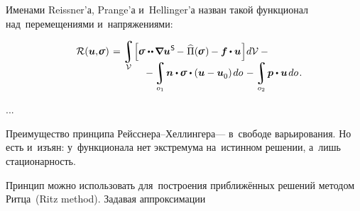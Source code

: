 \begin{otherlanguage}{russian}

\noindent
Именами Reissner’а, Prange’а и~Hellinger’а назван такой функционал над~перемещениями и~напряжениями:

\nopagebreak\vspace{-0.25em}\begin{multline}\label{reissnerhellingervariationalprinciple}
\shoveleft{\displaystyle \mathcal{R}(\bm{u}, \hspace{-0.32ex}\linearstress) \hspace{0.2ex} =
\integral\displaylimits_{\mathcal{V}} \hspace{-0.4ex}
\left[^{\mathstrut} \hspace{-0.2ex}
\linearstress \dotdotp \hspace{-0.16ex} \boldnabla {\bm{u}}^{\hspace{0.08ex}\mathsf{S}} \hspace{-0.2ex} - \hspace{.1ex} \widehat{\Pi}(\hspace{-0.1ex}\linearstress\hspace{.1ex})\hspace{-0.1ex} -
\bm{f} \hspace{-0.1ex} \dotp \bm{u}
\hspace{.1ex} \right] \hspace{-0.32ex} d\mathcal{V} \hspace{.5ex} - \hfill} \\[-1.2em]
%
\hspace{8em} \displaystyle - \integral\displaylimits_{o_1} \hspace{-0.25ex} \bm{n} \dotp \hspace{-0.1ex} \linearstress \dotp \left( \bm{u} - \bm{u}_{\raisemath{-0.1em}{0}} \right) \hspace{-0.1ex} do \hspace{.2ex} -
\integral\displaylimits_{o_2} \hspace{-0.2ex} \bm{p} \dotp \bm{u} \hspace{.25ex} do
\hspace{.2ex}.
\end{multline}


...


Преимущество принципа Рейсснера\hbox{--}Хеллингера\:--- в~свободе варьирования. Но есть и~изъян: у~функционала нет экстремума на~истинном решении, а~лишь стационарность.

Принцип можно использовать для~построения приближённых решений методом Ритца~(Ritz method). Задавая аппроксимации



\end{otherlanguage}
